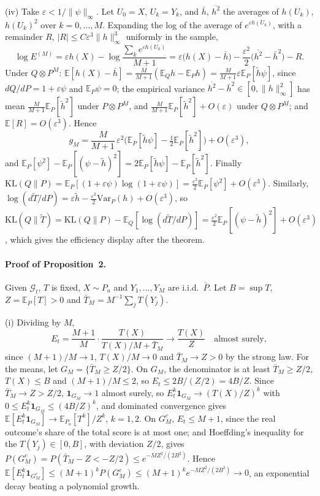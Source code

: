 \documentclass[11pt]{article}
\newcommand{\E}{\mathbb{E}}
\newcommand{\KL}{\mathrm{KL}}
\newcommand{\G}{\mathcal{G}}
\theoremstyle{remark}
\begin{document}
(iv) Take $\varepsilon < 1/\|\psi\|_\infty$. Let $U_0 = X$, $U_k = Y_k$, and
$\bar h$, $\overline{h^2}$ the averages of $h(U_k)$, $h(U_k)^2$ over
$k = 0, \ldots, M$. Expanding the log of the average of $e^{\varepsilon h(U_k)}$,
with a remainder $R$, $|R| \le C\varepsilon^3\|h\|_\infty^3$ uniformly in the sample,
\[
\log E^{(M)} = \varepsilon h(X) - \log\frac{\sum_k e^{\varepsilon h(U_k)}}{M+1}
= \varepsilon\big(h(X) - \bar h\big) - \frac{\varepsilon^2}{2}\big(\overline{h^2} - \bar h^2\big) - R .
\]
Under $Q \otimes P^M$: $\E[h(X) - \bar h] = \frac{M}{M+1}(\E_Q h - \E_P h)
= \frac{M}{M+1}\varepsilon\E_P[\tilde h\psi]$, since $dQ/dP = 1+\varepsilon\psi$
and $\E_P\psi = 0$; the empirical variance $\overline{h^2} - \bar h^2 \in [0, \|h\|_\infty^2]$
has mean $\frac{M}{M+1}\E_P[\tilde h^2]$ under $P \otimes P^M$, and
$\frac{M}{M+1}\E_P[\tilde h^2] + O(\varepsilon)$ under $Q \otimes P^M$; and
$\E[R] = O(\varepsilon^3)$. Hence
\[
g_M = \frac{M}{M+1}\,\varepsilon^2\Big(\E_P[\tilde h\psi] - \tfrac12\E_P[\tilde h^2]\Big) + O(\varepsilon^3),
\]
and $\E_P[\psi^2] - \E_P[(\psi - \tilde h)^2] = 2\E_P[\tilde h\psi] - \E_P[\tilde h^2]$.
Finally $\KL(Q\|P) = \E_P[(1 + \varepsilon\psi)\log(1 + \varepsilon\psi)]
= \frac{\varepsilon^2}{2}\E_P[\psi^2] + O(\varepsilon^3)$. Similarly,
$\log(d\tilde T/dP) = \varepsilon\tilde h - \frac{\varepsilon^2}{2}\mathrm{Var}_P(h)
+ O(\varepsilon^3)$, so
$\KL(Q\|\tilde T) = \KL(Q\|P) - \E_Q[\log(d\tilde T/dP)]
= \frac{\varepsilon^2}{2}\E_P[(\psi - \tilde h)^2] + O(\varepsilon^3)$, which
gives the efficiency display after the theorem.

\paragraph{Proof of Proposition~2.}
Given $\G_t$, $T$ is fixed, $X \sim P_a$ and $Y_1, \ldots, Y_M$ are i.i.d.\
$\bar P$. Let $B = \sup T$, $Z = \E_{\bar P}[T] > 0$ and
$\bar T_M = M^{-1}\sum_j T(Y_j)$.

(i) Dividing by $M$,
\[
E_t = \frac{M+1}{M}\cdot\frac{T(X)}{T(X)/M + \bar T_M} \to \frac{T(X)}{Z}
\quad\text{almost surely},
\]
since $(M+1)/M \to 1$, $T(X)/M \to 0$ and $\bar T_M \to Z > 0$ by the strong law.
For the means, let $G_M = \{\bar T_M \ge Z/2\}$. On $G_M$, the denominator is at
least $\bar T_M \ge Z/2$, $T(X) \le B$ and $(M+1)/M \le 2$, so
$E_t \le 2B/(Z/2) = 4B/Z$. Since $\bar T_M \to Z > Z/2$,
$\mathbf 1_{G_M} \to 1$ almost surely, so $E_t^k\mathbf 1_{G_M} \to (T(X)/Z)^k$
with $0 \le E_t^k\mathbf 1_{G_M} \le (4B/Z)^k$, and dominated convergence gives
$\E[E_t^k\mathbf 1_{G_M}] \to \E_{P_a}[T^k]/Z^k$, $k = 1, 2$. On $G_M^c$, $E_t \le M+1$, since the real outcome's
share of the total score is at most one; and Hoeffding's inequality
\citep{hoeffding1963probability} for the $T(Y_j) \in [0, B]$, with deviation
$Z/2$, gives $P(G_M^c) = P(\bar T_M - Z < -Z/2) \le e^{-MZ^2/(2B^2)}$. Hence
$\E[E_t^k\mathbf 1_{G_M^c}] \le (M+1)^k P(G_M^c) \le (M+1)^k e^{-MZ^2/(2B^2)} \to 0$,
an exponential decay beating a polynomial growth.
\end{document}
